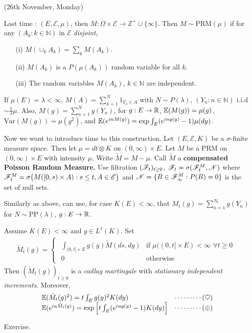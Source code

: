 \documentclass[12pt,a4paper]{report}
\newenvironment{proof}
{\begin{changemargin}{1cm}{0.5cm} 
	}%
	{\end{changemargin}
}
\begin{document}
\newday

(26th November, Monday)
\s

Last time : $(E,\mathscr{E},\mu)$, then $M : \Omega \times \mathscr{E} \rightarrow \mathbb{Z}^+ \cup \{\infty\}$. Then $M\sim \text{PRM}(\mu)$ if for any $(A_k : k\in \mathbb{N})$ in $\mathscr{E}$ \emph{disjoint},
\begin{itemize}
\item[(i)] $M(\cup_k A_k) = \sum_k M(A_k)$. 
\item[(ii)] $M(A_k)$ is a $P(\mu(A_k))$ random variable for all $k$.
\item[(iii)] The random variables $M(A_k)$, $k\in \mathbb{N}$ are independent.
\end{itemize}
If $\mu(E) =\lambda < \infty$, $M(A) = \sum_{k=1}^N 1_{Y_k \in A}$ with $N\sim P(\lambda)$, $(Y_n : n\in \mathbb{N})$ i.i.d $\sim \frac{1}{\lambda
}\mu$. Also, $M(g) = \sum_{n=1}^N g(Y_n)$, for $g: E \rightarrow \mathbb{R}$, $\mathbb{E}(M(g)) = \mu(g)$, $\text{Var}(M(g)) = \mu (g^2)$, and $\mathbb{E}(e^{inM(g)}) = \exp \int_E (e^{ing(y)}-1) \mu(dy)$.
\s

Now we want to introduce time to this construction. Let $(E, \mathscr{E} , K)$ be a $\sigma$-finite measure space. Then let $\mu = dt \otimes K$ on $(0, \infty) \times E$. Let $M$ be a $\text{PRM}$ on $(0,\infty) \times E$ with intensity $\mu$. Write $\tilde{M} = M-\mu$. Call $\tilde{M}$ a \textbf{compensated Poisson Random Measure.} Use filtration $(\mathscr{F}_t)_{t\geq 0}$, $\mathscr{F}_t = \sigma (\mathscr{F}_t^M, \mathscr{N})$ where $\mathscr{F}_t^M = \sigma \big( M([0,s) \times A ) : s\leq t, A\in \mathscr{E} \big)$ and $\mathscr{N} = \{B\in \mathscr{F}_{\infty}^M : P(B) =0\}$ is the set of null sets.
\s

Similarly as above, can use, for case $K(E)<\infty$, that $M_t(g) = \sum_{n=1}^{N_t} g(Y_n)$ for $N \sim \text{PP}(\lambda)$, $g: E\rightarrow \mathbb{R}$.
\s

 Assume $K(E) < \infty$ and $g\in L^1(K)$. Set
\begin{align*}
\tilde{M}_t(g) = \begin{cases}
\begin{array}{ll}
\int_{(0,t] \times E} g(y) \tilde{M} (ds,dy) & \text{if }  \mu( (0,t] \times E) < \infty \,\, \forall t\geq 0 \\
0 & \text{otherwise}
\end{array}
\end{cases}
\end{align*}
Then $(\tilde{M}_t(g))_{t\geq 0}$ is a \emph{cadlag martingale} with \emph{stationary independent increments}. Moreover,
\begin{align*}
\begin{array}{ll}
\mathbb{E}(\tilde{M}_t(g)^2) = t\int_E g(y)^2 K(dy) & \cdots\cdots\cdots (\heartsuit) \\
\mathbb{E}(e^{iu\tilde{M}_t(g)}) =\exp\Big[ t\int_E (e^{iug(y)}-1) K(dy) \Big] & \cdots\cdots\cdots (\oplus)
\end{array}
\end{align*}
\begin{proof}
\pf Exercise.
\end{proof}
\s
\end{document}
